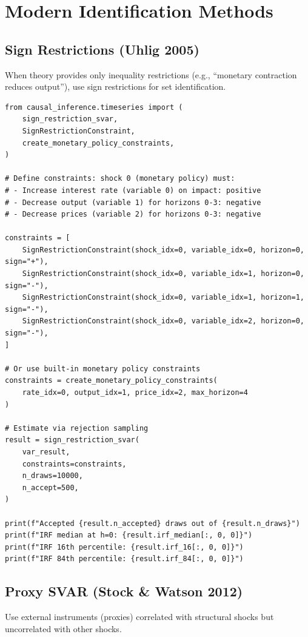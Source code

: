 \section{Modern Identification Methods}

\subsection{Sign Restrictions (Uhlig 2005)}

When theory provides only inequality restrictions (e.g., ``monetary contraction reduces output''), use sign restrictions for set identification.

\begin{verbatim}
from causal_inference.timeseries import (
    sign_restriction_svar,
    SignRestrictionConstraint,
    create_monetary_policy_constraints,
)

# Define constraints: shock 0 (monetary policy) must:
# - Increase interest rate (variable 0) on impact: positive
# - Decrease output (variable 1) for horizons 0-3: negative
# - Decrease prices (variable 2) for horizons 0-3: negative

constraints = [
    SignRestrictionConstraint(shock_idx=0, variable_idx=0, horizon=0, sign="+"),
    SignRestrictionConstraint(shock_idx=0, variable_idx=1, horizon=0, sign="-"),
    SignRestrictionConstraint(shock_idx=0, variable_idx=1, horizon=1, sign="-"),
    SignRestrictionConstraint(shock_idx=0, variable_idx=2, horizon=0, sign="-"),
]

# Or use built-in monetary policy constraints
constraints = create_monetary_policy_constraints(
    rate_idx=0, output_idx=1, price_idx=2, max_horizon=4
)

# Estimate via rejection sampling
result = sign_restriction_svar(
    var_result,
    constraints=constraints,
    n_draws=10000,
    n_accept=500,
)

print(f"Accepted {result.n_accepted} draws out of {result.n_draws}")
print(f"IRF median at h=0: {result.irf_median[:, 0, 0]}")
print(f"IRF 16th percentile: {result.irf_16[:, 0, 0]}")
print(f"IRF 84th percentile: {result.irf_84[:, 0, 0]}")
\end{verbatim}

\subsection{Proxy SVAR (Stock \& Watson 2012)}

Use external instruments (proxies) correlated with structural shocks but uncorrelated with other shocks.

